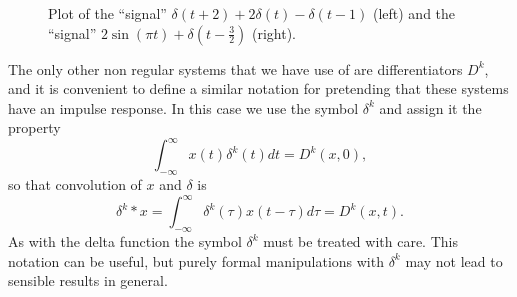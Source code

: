 \documentclass[11pt,a4paper]{book}
\theoremstyle{plain}
\numberwithin{equation}{section}
\newcommand{\vtick}[1]{\draw (#1,-0.075) -- (#1,0.075) }
\newcommand{\htick}[1]{\draw (-0.075,#1) -- (0.075,#1)}
\begin{document}
\begin{figure}[tp]
\centering
{} 
\;\;
\caption{Plot of the ``signal'' $\delta(t+2) + 2\delta(t) - \delta(t-1)$ (left) and the ``signal'' $2\sin(\pi t) + \delta(t - \tfrac{3}{2})$ (right).} \label{fig:deltafuncplotexample}
\end{figure}

The only other non regular systems that we have use of are differentiators $D^k$, and it is convenient to define a similar notation for pretending that these systems have an impulse response.  In this case we use the symbol $\delta^k$ and assign it the property
\[
\int_{-\infty}^\infty x(t) \delta^k(t) dt = D^k(x,0),
\]
so that convolution of $x$ and $\delta$ is
\[
\delta^k * x = \int_{-\infty}^{\infty} \delta^k(\tau) x(t - \tau) d\tau = D^k(x,t).
\]
As with the delta function the symbol $\delta^k$ must be treated with care.  This notation can be useful, but purely formal manipulations with $\delta^k$ may not lead to sensible results in general.
\end{document}
